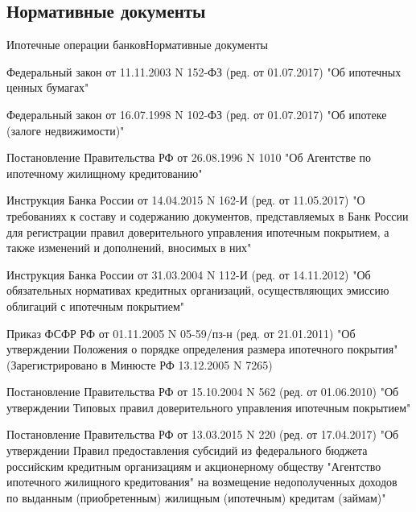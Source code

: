 \documentclass[_Banking_p2.tex]{subfiles}
\begin{document}
\subsection{Нормативные документы}
\begin{frame}[allowframebreaks]{Ипотечные операции банков}{Нормативные документы}
  \begin{thebibliography}{10}
  
  \beamertemplatearticlebibitems

Федеральный закон от 11.11.2003 N 152-ФЗ (ред. от 01.07.2017) "Об ипотечных ценных бумагах"

Федеральный закон от 16.07.1998 N 102-ФЗ (ред. от 01.07.2017) "Об ипотеке (залоге недвижимости)"

Постановление Правительства РФ от 26.08.1996 N 1010 "Об Агентстве по ипотечному жилищному кредитованию"

\pagebreak

Инструкция Банка России от 14.04.2015 N 162-И (ред. от 11.05.2017) "О требованиях к составу и содержанию документов, представляемых в Банк России для регистрации правил доверительного управления ипотечным покрытием, а также изменений и дополнений, вносимых в них" 

Инструкция Банка России от 31.03.2004 N 112-И (ред. от 14.11.2012) "Об обязательных нормативах кредитных организаций, осуществляющих эмиссию облигаций с ипотечным покрытием"

\pagebreak

Приказ ФСФР РФ от 01.11.2005 N 05-59/пз-н (ред. от 21.01.2011) "Об утверждении Положения о порядке определения размера ипотечного покрытия" (Зарегистрировано в Минюсте РФ 13.12.2005 N 7265)

Постановление Правительства РФ от 15.10.2004 N 562 (ред. от 01.06.2010) "Об утверждении Типовых правил доверительного управления ипотечным покрытием"

\pagebreak

Постановление Правительства РФ от 13.03.2015 N 220 (ред. от 17.04.2017) "Об утверждении Правил предоставления субсидий из федерального бюджета российским кредитным организациям и акционерному обществу "Агентство ипотечного жилищного кредитования" на возмещение недополученных доходов по выданным (приобретенным) жилищным (ипотечным) кредитам (займам)"

\pagebreak


\end{thebibliography}
\end{frame}
\end{document}
